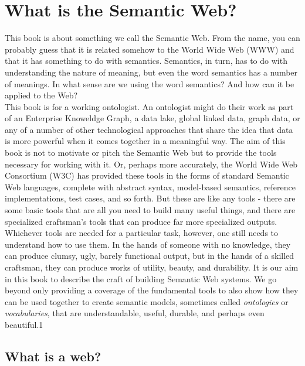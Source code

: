 \chapter{What is the Semantic Web?}
\label{ch1}

This book is about something we call the Semantic Web. From the name, you can probably guess that it is related somehow to the World Wide Web (WWW) 
and that it has something to do with semantics. Semantics, in turn, has to do with understanding the nature of meaning, but even the word 
semantics has a number of meanings. In what sense are we using the word semantics? And how can it be applied to the Web?\\



This book is for a working ontologist. An ontologist might do their work as part of an 
Enterprise Knoweldge Graph, a data lake, global linked data, graph data, or any of a 
number of other technological approaches that share the idea that data is more powerful
when it comes together in a meaningful way. 
The aim of this book is not to motivate or pitch the Semantic Web
but to provide the tools 
necessary for working with it. Or, perhaps more accurately, the World
Wide Web Consortium (W3C) has provided these tools in the forms of 
standard Semantic Web languages, complete with abstract syntax, model-based semantics, reference implementations, test cases, and so forth. But these are 
like any tools - there are some basic tools that are all you need to build many useful things, and there are specialized craftsman’s 
tools that can produce far more specialized outputs. Whichever tools are needed for a particular task, however,  one  still  needs  to  
understand  how  to  use  them.  In the hands of someone with no knowledge, they can produce clumsy, ugly, barely functional output, but 
in the hands of a skilled craftsman, they can produce works of utility, beauty, and durability. It is our aim in this book to describe 
the craft of building Semantic Web systems. We go beyond only providing a coverage of  the  fundamental  tools  to  also  show  how  
they  can  be  used  together  to  create  semantic models, sometimes called \textit{ontologies} or \textit{vocabularies}, that are 
understandable, useful, durable, and perhaps even beautiful.1


\section{What is a web?}
\label{ch01.sec11.1}

